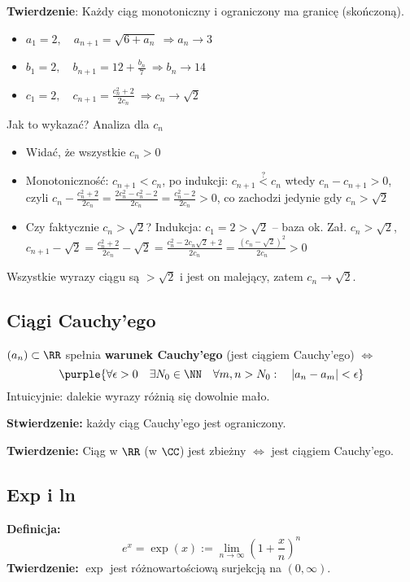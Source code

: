 \textbf{Twierdzenie}:
Każdy ciąg monotoniczny i ograniczony ma granicę (skończoną).
\begin{example}
\begin{itemize}
    \item $a_1=2, \quad a_{n+1}=\sqrt{6 + a_n} \ \Longrightarrow a_n \to 3$
    \item $b_1=2, \quad b_{n+1}=12 + \frac{b_n}{7} \ \Longrightarrow b_n \to 14$
    \item $c_1=2, \quad c_{n+1}=\frac{c_n^2 + 2}{2c_n} \ \Longrightarrow c_n \to \sqrt{2}$
\end{itemize}
Jak to wykazać? Analiza dla $c_n$
\begin{itemize}
    \item Widać, że wszystkie $c_n>0$
    \item Monotoniczność: $c_{n+1} < c_n$, po indukcji: $c_{n+1} \stackrel {?}{<} c_n$ wtedy $c_n-c_{n+1}>0$, czyli $c_n-\frac{c_n^2+2}{2c_n}=\frac{2c_n^2-c_n^2-2}{2c_n}=\frac{c_n^2-2}{2c_n}>0$, co zachodzi jedynie gdy $c_n > \sqrt{2}$
    \item Czy faktycznie $c_n>\sqrt{2}$? Indukcja: $c_1=2>\sqrt{2}$ -- baza ok. Zał. $c_n>\sqrt{2}$, $c_{n+1}-\sqrt{2}=\frac{c_n^2+2}{2c_n}-\sqrt{2}=\frac{c_n^2-2c_n\sqrt{2} + 2}{2c_n} = \frac{(c_n-\sqrt{2})^2}{2c_n}>0$
\end{itemize}
Wszystkie wyrazy ciągu są $>\sqrt{2}$ i jest on malejący, zatem $c_n\to \sqrt{2}$.
\end{example}

\subsection{Ciągi Cauchy'ego}
$(a_n) \subset \RR$ spełnia \textbf{warunek Cauchy'ego} (jest ciągiem Cauchy'ego) $\Longleftrightarrow$
$$
\purple{\forall \epsilon > 0 \quad \exists N_0\in \NN \quad \forall m,n > N_0: \quad |a_n-a_m| < \epsilon}
$$
Intuicyjnie: dalekie wyrazy różnią się dowolnie mało.

\textbf{Stwierdzenie:} każdy ciąg Cauchy'ego jest ograniczony.

\textbf{Twierdzenie:} Ciąg w $\RR$ (w $\CC$) jest zbieżny $\Longleftrightarrow$ jest ciągiem Cauchy'ego.

\subsection{Exp i ln}
\textbf{Definicja:} $$e^x=\exp(x) := \lim_{n\to\infty}\left(1 + \frac{x}{n}\right)^n$$
\textbf{Twierdzenie:} $\exp$ jest różnowartościową surjekcją na $(0, \infty)$.

